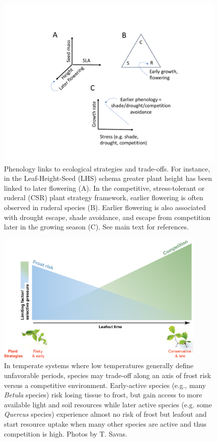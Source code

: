 \documentclass[11pt]{article}
\begin{document}
\begin{figure}[h!]
\centering
\includegraphics[width=1\textwidth]{..//figures/figsubmit/AREESfigure.pdf}
\caption{Phenology links to ecological strategies and trade-offs. For instance, in the Leaf-Height-Seed (LHS) schema greater plant height has been linked to later flowering (A). In the competitive, stress-tolerant or ruderal (CSR) plant strategy framework, earlier flowering is often observed in ruderal species (B). Earlier flowering is also associated with drought escape, shade avoidance, and escape from competition later in the growing season (C). See main text for references.}
 \label{fig:traitcorr}
\end{figure}


\begin{figure}[h!]
\centering
\includegraphics[width=0.9\textwidth]{..//figures/figsubmit/frosttradeoffs2.png}
\caption{In temperate systems where low temperatures generally define unfavorable periods, species may trade-off along an axis of frost risk versus a competitive environment. Early-active species (e.g., many \emph{Betula} species) risk losing tissue to frost, but gain access to more available light and soil resources while later active species  (e.g. some \emph{Quercus} species) experience almost no risk of frost but leafout and start resource uptake when many other species are active and thus competition is high. Photos by T. Savas.}
 \label{fig:seasonaltradeoffs}
\end{figure}
\end{document}
